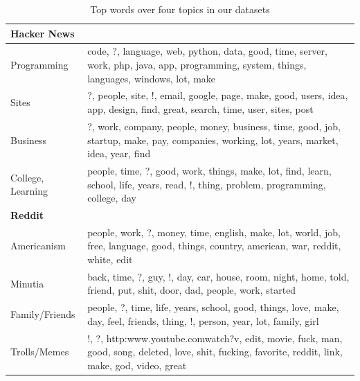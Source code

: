 \documentclass{article}
\begin{document}
\begin{table}[h]\footnotesize
  \begin{tabularx}{0.5\textwidth}{| l X |}
   \hline
   \textbf{Hacker News} & \\
   \hline
   Programming  & code, ?, language, web, python, data, good, time, server, work, php, java, app, programming, system, things, languages, windows, lot, make \\

  Sites  & ?, people, site, !, email, google, page, make, good, users, idea, app, design, find, great, search, time, user, sites, post \\

  Business  & ?, work, company, people, money, business, time, good, job, startup, make, pay, companies, working, lot, years, market, idea, year, find \\

  College,  Learning  & people, time, ?, good, work, things, make, lot, find, learn, school, life, years, read, !, thing, problem, programming, college, day \\
   \hline
   \textbf{Reddit} & \\
   \hline
  Americanism & people, work, ?, money, time, english, make, lot, world, job, free, language, good, things, country, american, war, reddit, white, edit \\

  Minutia & back, time, ?, guy, !, day, car, house, room, night, home, told, friend, put, shit, door, dad, people, work, started \\

  Family/Friends  & people, ?, time, life, years, school, good, things, love, make, day, feel, friends, thing, !, person, year, lot, family, girl \\

  Trolls/Memes  & !, ?, http:\/\/www.youtube.com\/watch?v, edit, movie, fuck, man, good, song, deleted, love, shit, fucking, favorite, reddit, link, make, god, video, great \\
   \hline
  \end{tabularx}
  \caption{Top words over four topics in our datasets}
  \label{table:lda}
\end{table}
\end{document}

